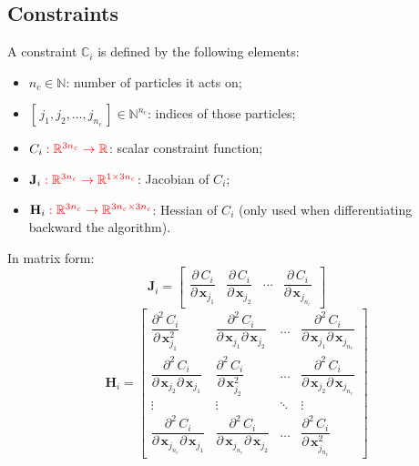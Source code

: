 \documentclass{article}
\newcommand{\pd}[2]{\dfrac{\partial\, #1}{\partial\, #2}}
\newcommand{\pdv}[2]{\dfrac{\partial^2\, #1}{\partial\, #2^2}}
\newcommand{\pdm}[3]{\dfrac{\partial^2\, #1}{\partial\, #2 \partial\, #3}}
\newcommand{\red}[1]{\textcolor{red}{#1}}
\begin{document}
\subsection{Constraints}
A constraint $\mathbb{C}_i$ is defined by the following elements:
\begin{itemize}
    \item $n_c \in \mathbb{N}$: number of particles it acts on;
    \item $[\,j_1, j_2, \dots, j_{n_c}\,] \in \mathbb{N}^{n_c}$: indices of those particles;
    \item $C_i \;\red{: \mathbb{R}^{3n_c}\rightarrow\mathbb{R}}$: scalar constraint function;
    \item $\mathbf{J}_i \;\red{: \mathbb{R}^{3n_c}\rightarrow\mathbb{R}^{1 \times 3n_c}}$: Jacobian of $C_i$;
    \item $\mathbf{H}_i \;\red{: \mathbb{R}^{3n_c}\rightarrow\mathbb{R}^{3n_c \times 3n_c}}$: Hessian of $C_i$ (only used when differentiating backward the algorithm).
\end{itemize}
In matrix form:
\begin{equation*}
    \mathbf{J}_i = 
    \begin{bmatrix}
        \displaystyle \pd{C_i}{\mathbf{x}_{j_1}} &
        \displaystyle \pd{C_i}{\mathbf{x}_{j_2}} &
        \displaystyle \cdots &
        \displaystyle \pd{C_i}{\mathbf{x}_{j_{n_c}}}
    \end{bmatrix}
\end{equation*}
\begin{equation*}
\mathbf{H}_i = 
\begin{bmatrix}
    \displaystyle \pdv{C_i}{\mathbf{x}_{j_1}} &
    \displaystyle \pdm{C_i}{\mathbf{x}_{j_1}}{\mathbf{x}_{j_2}} & 
    \dots &
    \displaystyle \pdm{C_i}{\mathbf{x}_{j_1}}{\mathbf{x}_{j_{n_c}}} 
    \\[3ex]
    \displaystyle \pdm{C_i}{\mathbf{x}_{j_2}}{\mathbf{x}_{j_1}} &
    \displaystyle \pdv{C_i}{\mathbf{x}_{j_2}} &
    \dots &
    \displaystyle \pdm{C_i}{\mathbf{x}_{j_2}}{\mathbf{x}_{j_{n_c}}}
    \\[3ex]
    \vdots & \vdots & \ddots & \vdots 
    \\[3ex]
    \displaystyle \pdm{C_i}{\mathbf{x}_{j_{n_c}}}{\mathbf{x}_{j_1}} &
    \displaystyle \pdm{C_i}{\mathbf{x}_{j_{n_c}}}{\mathbf{x}_{j_2}} &
    \dots &
    \displaystyle \pdv{C_i}{\mathbf{x}_{j_{n_c}}}
\end{bmatrix}
\end{equation*}
\end{document}
